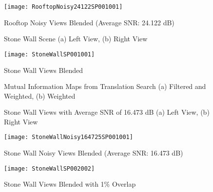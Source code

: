 \begin{figure}
\centering
\texttt{[image: RooftopNoisy24122SP001001]}
\caption{Rooftop Noisy Views Blended (Average SNR: 24.122 dB)}
\label{RooftopNoisyStitched}
\end{figure}

\begin{figure}
\label{StoneWallImages}
\centering
{}
\caption{Stone Wall Scene (a) Left View, (b) Right View}
\end{figure}

\begin{figure}
\label{StoneWallStitched}
\centering
\texttt{[image: StoneWallSP001001]}
\caption{Stone Wall Views Blended}
\end{figure}

\begin{figure}
\centering
{}
\caption{Mutual Information Maps from Translation Search (a) Filtered and Weighted, (b) Weighted}
\label{StoneWallNoisyImagesMI}
\end{figure}

\begin{figure}
\centering
{}
\caption{Stone Wall Views with Average SNR of 16.473 dB (a) Left View, (b) Right View}
\label{StoneWallNoisyImages}
\end{figure}

\begin{figure}
\centering
\texttt{[image: StoneWallNoisy164725SP001001]}
\caption{Stone Wall Noisy Views Blended (Average SNR: 16.473 dB)}
\label{StoneWallNoisyStitched}
\end{figure}

\begin{figure}
\centering
\texttt{[image: StoneWallSP002002]}
\caption{Stone Wall Views Blended with 1\% Overlap}
\label{StoneWallSmall}
\end{figure}

